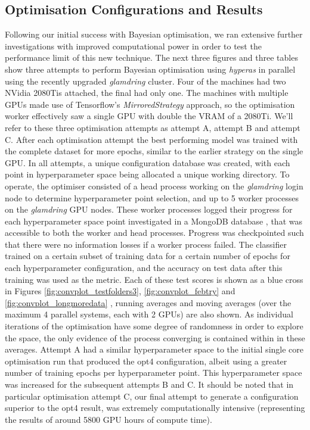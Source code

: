 \subsection{Optimisation Configurations and Results}
Following our initial success with Bayesian optimisation, we ran extensive further investigations with improved computational power in order to test the performance limit of this new technique. The next three figures and three tables show three attempts to perform Bayesian optimisation using \textit{hyperas} in parallel using the recently upgraded \textit{glamdring} cluster. Four of the machines had two NVidia 2080Tis attached, the final had only one. The machines with multiple GPUs made use of Tensorflow's \textit{MirroredStrategy} approach, so the optimisation worker effectively saw a single GPU with double the VRAM of a 2080Ti. We'll refer to these three optimisation attempts as attempt A, attempt B and attempt C. After each optimisation attempt the best performing model was trained with the complete dataset for more epochs, similar to the earlier strategy on the single GPU. In all attempts, a unique configuration database was created, with each point in hyperparameter space being allocated a unique working directory. To operate, the optimiser consisted of a head process working on the \textit{glamdring} login node to determine hyperparameter point selection, and up to 5 worker processes on the \textit{glamdring} GPU nodes. These worker processes logged their progress for each hyperparameter space point investigated in a MongoDB database \cite{mongodb}, that was accessible to both the worker and head processes. Progress was checkpointed such that there were no information losses if a worker process failed. The classifier trained on a certain subset of training data for a certain number of epochs for each hyperparameter configuration, and the accuracy on test data after this training was used as the metric. Each of these test scores is shown as a blue cross in Figures \ref{fig:convplot_testfolders3}, \ref{fig:convplot_febtry} and \ref{fig:convplot_longmoredata} , running averages and moving averages (over the maximum 4 parallel systems, each with 2 GPUs) are also shown. As individual iterations of the optimisation have some degree of randomness in order to explore the space, the only evidence of the process converging is contained within in these averages. Attempt A had a similar hyperparameter space to the initial single core optimisation run that produced the opt4 configuration, albeit using a greater number of training epochs per hyperparameter point. This hyperparameter space was increased for the subsequent attempts B and C. It should be noted that in particular optimisation attempt C, our final attempt to generate a configuration superior to the opt4 result, was extremely computationally intensive (representing the results of around 5800 GPU hours of compute time).

